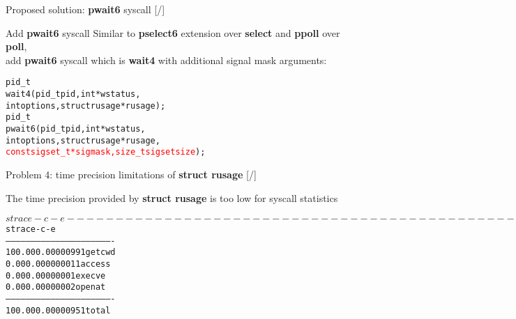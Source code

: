 \documentclass[unicode,aspectratio=169]{beamer}
\begin{document}
\begin{frame}[fragile]{Proposed solution: \textbf{pwait6} syscall \hfill [\insertframenumber/\inserttotalframenumber]}
\Large
\begin{block}{Add \textbf{pwait6} syscall}
Similar to \textbf{pselect6} extension over \textbf{select}
and \textbf{ppoll} over \textbf{poll}, \\
add \textbf{pwait6} syscall
which is \textbf{wait4} with additional signal mask arguments:
\begin{alltt}
pid_t
wait4(pid_t pid, int *wstatus,
      int options, struct rusage *rusage);
pid_t
pwait6(pid_t pid, int *wstatus,
       int options, struct rusage *rusage,
       \textcolor{red}{const sigset_t *sigmask, size_t sigsetsize});
\end{alltt}
\end{block}
\end{frame}

\begin{frame}[fragile]{Problem 4: time precision limitations of \textbf{struct rusage} \hfill [\insertframenumber/\inserttotalframenumber]}
\begin{block}{The time precision provided by \textbf{struct rusage} is too low for syscall statistics}
\scriptsize
\begin{alltt}
$ strace -c -e%file pwd > /dev/null
% time     seconds  usecs/call     calls    errors syscall
------ ----------- ----------- --------- --------- ----------------
 53.09    0.000043          43         1           execve
 30.86    0.000025          12         2           openat
 16.05    0.000013          13         1         1 access
  0.00    0.000000           0         1           getcwd
------ ----------- ----------- --------- --------- ----------------
100.00    0.000081                     5         1 total

$ strace -c -e%file pwd > /dev/null
% time     seconds  usecs/call     calls    errors syscall
------ ----------- ----------- --------- --------- ----------------
100.00    0.000009           9         1           getcwd
  0.00    0.000000           0         1         1 access
  0.00    0.000000           0         1           execve
  0.00    0.000000           0         2           openat
------ ----------- ----------- --------- --------- ----------------
100.00    0.000009                     5         1 total
\end{alltt}
\end{block}
\end{frame}
\end{document}
